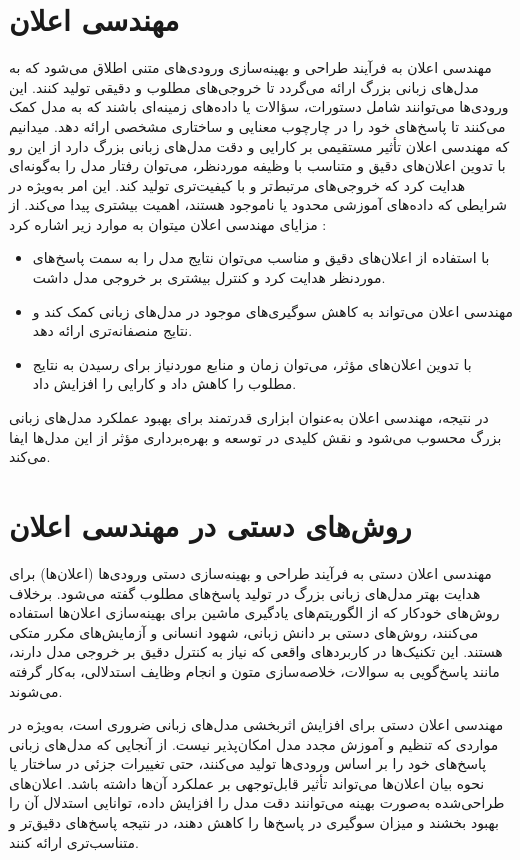 \section{مهندسی اعلان}
مهندسی اعلان 
 به فرآیند طراحی و بهینه‌سازی ورودی‌های متنی اطلاق می‌شود که به مدل‌های زبانی بزرگ ارائه می‌گردد تا خروجی‌های مطلوب و دقیقی تولید کنند. این ورودی‌ها می‌توانند شامل دستورات، سؤالات یا داده‌های زمینه‌ای باشند که به مدل کمک می‌کنند تا پاسخ‌های خود را در چارچوب معنایی و ساختاری مشخصی ارائه دهد.
می\/دانیم که مهندسی اعلان تأثیر مستقیمی بر کارایی و دقت مدل‌های زبانی بزرگ دارد از این رو با تدوین اعلان‌های دقیق و متناسب با وظیفه موردنظر، می‌توان رفتار مدل را به‌گونه‌ای هدایت کرد که خروجی‌های مرتبط‌تر و با کیفیت‌تری تولید کند. این امر به‌ویژه در شرایطی که داده‌های آموزشی محدود یا ناموجود هستند، اهمیت بیشتری پیدا می‌کند.
از مزایای مهندسی اعلان میتوان به موارد زیر اشاره کرد :
\begin{itemize}
	\item 
	با استفاده از اعلان‌های دقیق و مناسب می‌توان نتایج مدل را به سمت پاسخ‌های موردنظر هدایت کرد و کنترل بیشتری بر خروجی مدل داشت.
	\item 
	مهندسی اعلان می‌تواند به کاهش سوگیری‌های موجود در مدل‌های زبانی کمک کند و نتایج منصفانه‌تری ارائه دهد.
	\item 
	با تدوین اعلان‌های مؤثر، می‌توان زمان و منابع موردنیاز برای رسیدن به نتایج مطلوب را کاهش داد و کارایی را افزایش داد.
\end{itemize}

در نتیجه، مهندسی اعلان به‌عنوان ابزاری قدرتمند برای بهبود عملکرد مدل‌های زبانی بزرگ محسوب می‌شود و نقش کلیدی در توسعه و بهره‌برداری مؤثر از این مدل‌ها ایفا می‌کند.

\section{روش‌های دستی در مهندسی اعلان}
مهندسی اعلان دستی به فرآیند طراحی و بهینه‌سازی دستی ورودی‌ها (اعلان‌ها) برای هدایت بهتر مدل‌های زبانی بزرگ در تولید پاسخ‌های مطلوب گفته می‌شود. برخلاف روش‌های خودکار که از الگوریتم‌های یادگیری ماشین برای بهینه‌سازی اعلان‌ها استفاده می‌کنند، روش‌های دستی بر دانش زبانی، شهود انسانی و آزمایش‌های مکرر متکی هستند. این تکنیک‌ها در کاربردهای واقعی که نیاز به کنترل دقیق بر خروجی مدل دارند، مانند پاسخ‌گویی به سوالات، خلاصه‌سازی متون و انجام وظایف استدلالی، به‌کار گرفته می‌شوند.  

مهندسی اعلان دستی برای افزایش اثربخشی مدل‌های زبانی ضروری است، به‌ویژه در مواردی که تنظیم و آموزش مجدد مدل امکان‌پذیر نیست. از آنجایی که مدل‌های زبانی پاسخ‌های خود را بر اساس ورودی‌ها تولید می‌کنند، حتی تغییرات جزئی در ساختار یا نحوه بیان اعلان‌ها می‌تواند تأثیر قابل‌توجهی بر عملکرد آن‌ها داشته باشد. اعلان‌های طراحی‌شده به‌صورت بهینه می‌توانند دقت مدل را افزایش داده، توانایی استدلال آن را بهبود بخشند و میزان سوگیری در پاسخ‌ها را کاهش دهند، در نتیجه پاسخ‌های دقیق‌تر و متناسب‌تری ارائه کنند.

